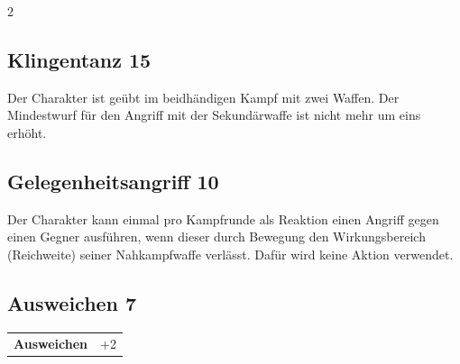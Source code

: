 \begin{multicols}{2}
\begin{tcolorbox}
\end{tcolorbox}

\begin{tcolorbox}
    \subsection*{Klingentanz \hfill \small{15 }}
    \tcblower
Der Charakter ist geübt im beidhändigen Kampf mit zwei Waffen. Der Mindestwurf für den Angriff mit der Sekundärwaffe ist nicht mehr um eins erhöht.


\vspace{3mm}



\end{tcolorbox}

\begin{tcolorbox}
    \subsection*{Gelegenheitsangriff \hfill \small{10 }}
    \tcblower
Der Charakter kann einmal pro Kampfrunde als Reaktion einen Angriff gegen einen Gegner ausführen, wenn dieser durch Bewegung den Wirkungsbereich (Reichweite) seiner Nahkampfwaffe verlässt. Dafür wird keine Aktion verwendet.


\vspace{3mm}



\end{tcolorbox}

\begin{tcolorbox}
    \subsection*{Ausweichen \hfill \small{7 }}
    \tcblower




\begin{tabular}{@{}ll@{}}
    \textbf{Ausweichen} & +2\\
\end{tabular}



\end{tcolorbox}
\end{multicols}
